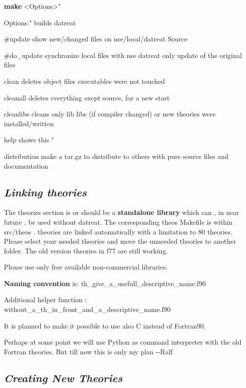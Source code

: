 \documentclass[]{article}
\begin{document}
\textbf{make} \textless{}Options\textgreater{}"

Options:" builds datreat

\#update show new/changed files on nse/local/datreat Source

\#do\_update synchronize local files with nse datreat only update of the
original files

clean deletes object files executables were not touched

cleanall deletes everything exept source, for a new start

cleanlibs cleans only lib libs (if compiler changed) or new theories
were installed/written

help shows this "

distribution make a tar.gz to distribute to others with pure source
files and documentation

\hypertarget{linking-theories}{%
\subsection{\texorpdfstring{\emph{Linking
theories}}{Linking theories}}\label{linking-theories}}

The theories section is or should be a \textbf{standalone library} which
can , in near future , be used without datreat. The corresponding theos
Makefile is within src/theos . theories are linked automatically with a
limitation to 80 theories. Please select your needed theories and move
the unneeded theories to another folder. The old version theories in f77
are still working.

Please use only free available non-commercial libraries.

\textbf{Naming convention} is:
th\_give\_a\_usefull\_descriptive\_name.f90

Additional helper function :
without\_a\_th\_in\_front\_and\_a\_descriptive\_name.f90

It is planned to make it possible to use also C instead of Fortran90.

Perhaps at some point we will use Python as command interpreter with the
old Fortran theories. But till now this is only my plan -\/-Ralf

\hypertarget{creating-new-theories}{%
\subsection{\texorpdfstring{\emph{Creating New
Theories}}{Creating New Theories}}\label{creating-new-theories}}
\end{document}

